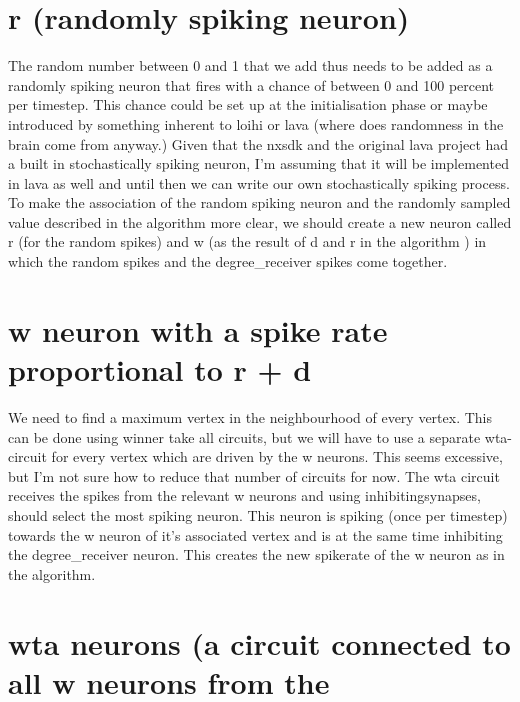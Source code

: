 \section{r (randomly spiking neuron)}\label{sec:random}
The random number between 0 and 1 that we add thus needs to be added as a
randomly spiking neuron that fires with a chance of between 0 and 100 percent
per timestep. This chance could be set up at the initialisation phase or maybe
introduced by something inherent to loihi or lava (where does randomness in
the brain come from anyway.) Given that the nxsdk and the original lava project
had a built in stochastically spiking neuron, I'm assuming that it will be
implemented in lava as well and until then we can write our own stochastically
spiking process. To make the association of the random spiking neuron and the
randomly sampled value described in the algorithm more clear, we should
create a new neuron called r (for the random spikes) and w (as the result of d
and r in the algorithm ) in which the random spikes and the degree\_receiver
spikes come together.
\section{w neuron with a spike rate proportional to r + d}\label{sec:weight_neuron}
We need to find a maximum vertex in the neighbourhood of every vertex. This
can be done using winner take all circuits, but we will have to use a separate
wta-circuit for every vertex which are driven by the w neurons. This seems
excessive, but I'm not sure how to reduce that number of circuits for now. The
wta circuit receives the spikes from the relevant w neurons and using inhibitingsynapses, should select the most spiking neuron. This neuron is spiking (once
per timestep) towards the w neuron of it's associated vertex and is at the same
time inhibiting the degree\_receiver neuron. This creates the new spikerate of
the w neuron as in the algorithm.

\section{wta neurons (a circuit connected to all w neurons from the}\label{sec:wta_circuits}

